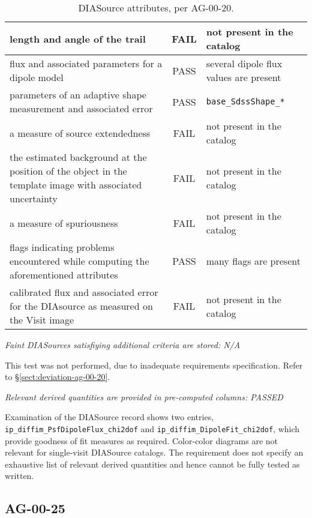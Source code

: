 \documentclass[DM,lsstdraft,STR,toc]{lsstdoc}
\begin{document}
\begin{table}[h]
\begin{tabular}{|p{}|c|p{}|}
        \hline
        length and angle of the trail & FAIL & not present in the catalog \\
        \hline
        flux and associated parameters for a dipole model & PASS & several dipole flux values are present \\
        \hline
        parameters of an adaptive shape measurement and associated error & PASS & \texttt{base\_SdssShape\_*} \\
        \hline
        a measure of source extendedness & FAIL & not present in the catalog \\
        \hline
        the estimated background at the position of the object in the template image with associated uncertainty & FAIL & not present in the catalog \\
        \hline
        a measure of spuriousness & FAIL &  not present in the catalog \\
        \hline
        flags indicating problems encountered while computing the aforementioned attributes & PASS & many flags are present \\
        \hline
        calibrated flux and associated error for the DIAsource as measured on the Visit image & FAIL & not present in the catalog \\
        \hline
    \end{tabular}
    \caption{DIASource attributes, per AG-00-20. \label{tab:diasrc}}
\end{table}

\textit{Faint DIASources satisfiying additional criteria are stored: N/A}

This test was not performed, due to inadequate requirements specification. Refer to \S\ref{sect:deviation-ag-00-20}.

\textit{Relevant derived quantities are provided in pre-computed columns: PASSED}

Examination of the DIASource record shows two entries,
\texttt{ip\_diffim\_PsfDipoleFlux\_chi2dof} and
\texttt{ip\_diffim\_DipoleFit\_chi2dof}, which provide goodness of fit measures
as required.  Color-color diagrams are not relevant for single-visit DIASource
catalogs. The requirement does not specify an exhaustive list of relevant
derived quantities and hence cannot be fully tested as written.

\subsection{AG-00-25}
\label{sect:ag-00-25}
\end{document}
